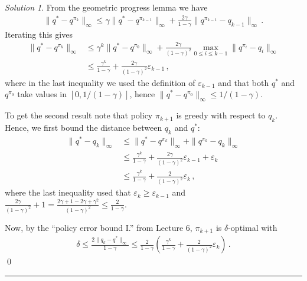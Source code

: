 \documentclass{article}
\newcommand{\norm}[1]{\| #1 \|}
\DeclareMathOperator*{\1}{\mathbbm{1}}
\theoremstyle{definition}
\theoremstyle{remark}
\newtheorem*{solution*}{Solution}
\begin{document}
\begin{solution*}
From the geometric progress lemma we have 
\begin{align*}
\norm{ q^* - q^{\pi_k} }_\infty 
\le 
\gamma \norm{ q^* - q^{\pi_{k-1}} }_\infty  + \frac{2\gamma}{1-\gamma} \norm{ q^{\pi_{k-1}}-q_{k-1}}_\infty\,.
\end{align*}
Iterating this gives
\begin{align*}
\norm{ q^* - q^{\pi_k} }_\infty 
& \le 
\gamma^k \norm{ q^* - q^{\pi_{0}} }_\infty  + 
\frac{2\gamma}{(1-\gamma)^2} \max_{0 \le i \le k-1} \norm{ q^{\pi_{i}}-q_{i}}_\infty \\
& \le 
\frac{\gamma^k}{1-\gamma}  + 
\frac{2\gamma}{(1-\gamma)^2} \varepsilon_{k-1}\,,
\end{align*}
where in the last inequality we used the definition of $\varepsilon_{k-1}$ 
and that both $q^*$ and $q^{\pi_0}$ take values in $[0,1/(1-\gamma)]$, hence 
$\norm{ q^* - q^{\pi_{0}} }_\infty \le 1/(1-\gamma)$.


To get the second result note that policy $\pi_{k+1}$ is greedy with respect to $q_k$. Hence, we first bound the distance between $q_k$ and $q^*$:
\begin{align*}
\norm{ q^* - q_{k}}_\infty
& \le 
\norm{ q^* - q^{\pi_k} }_\infty
+
\norm{ q^{\pi_k} - q_k }_\infty \\
& \le 
\frac{\gamma^k}{1-\gamma}  + 
\frac{2\gamma}{(1-\gamma)^2} \varepsilon_{k-1}
+
\varepsilon_k \\
& \le 
\frac{\gamma^k}{1-\gamma}  + \frac{2}{(1-\gamma)^2} \varepsilon_k \,,
\end{align*}
where the last inequality used that 
$\varepsilon_k \ge \varepsilon_{k-1}$ and
$\frac{2\gamma}{(1-\gamma)^2}+1 = \frac{2\gamma+1-2\gamma+\gamma^2}{(1-\gamma)^2} \le \frac{2}{1-\gamma}$.

Now, by the ``policy error bound I.'' 
from Lecture 6, $\pi_{k+1}$ is $\delta$-optimal with
\begin{align*}
\delta 
\le \frac{2\norm{q_k-q^*}_\infty}{1-\gamma} 
\le 
\frac{2}{1-\gamma} \left( 
\frac{\gamma^k}{1-\gamma}  + \frac{2}{(1-\gamma)^2} \varepsilon_k  \right)\,.
\end{align*}
\qed\par\smallskip\hrule
\end{solution*}
\end{document}
